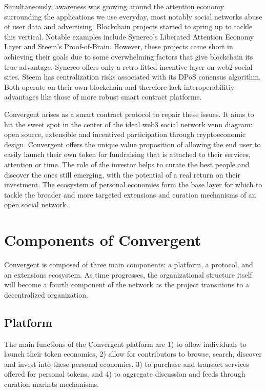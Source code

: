 \documentclass[a4paper, 10pt]{article}
\begin{document}
Simultaneously, awareness was growing around the attention economy surrounding the applications we use everyday, most notably social networks abuse of user data and advertising. Blockchain projects started to spring up to tackle this vertical. Notable examples include Synereo's Liberated Attention Economy Layer\cite{synereo} and Steem's Proof-of-Brain\cite{steem}. However, these projects came short in achieving their goals due to some overwhelming factors that give blockchain its true advantage. Synereo offers only a retro-fitted incentive layer on web2 social sites. Steem has centralization risks associated with its DPoS conensus algorithm. Both operate on their own blockchain and therefore lack interoperabilitiy advantages like those of more robust smart contract platforms.

Convergent arises as a smart contract protocol to repair these issues. It aims to hit the sweet spot in the center of the ideal web3 social network venn diagram: open source, extensible and incentived participation through cryptoeconomic design. Convergent offers the unique value proposition of allowing the end user to easily launch their own token for fundraising that is attached to their services, attention or time. The role of the investor helps to curate the best people and discover the ones still emerging, with the potential of a real return on their investment. The ecosystem of personal economies form the base layer for which to tackle the broader and more targeted extensions and curation mechanisms of an open social network.

\section{Components of Convergent}

Convergent is composed of three main components: a platform, a protocol, and an extensions ecosystem. As time progresses, the organizational structure itself will become a fourth component of the network as the project transitions to a decentralized organization. 

\subsection{Platform}

The main functions of the Convergent platform are 1) to allow individuals to launch their token economies, 2) allow for contributors to browse, search, discover and invest into these personal economies, 3) to purchase and transact services offered for personal tokens, and 4) to aggregate discussion and feeds through curation markets mechanisms.
\end{document}
